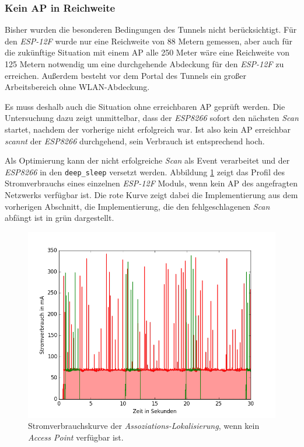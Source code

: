 \subsubsection{Kein AP in Reichweite}
Bisher wurden die besonderen Bedingungen des Tunnels nicht berücksichtigt.
Für den \emph{ESP-12F} wurde nur eine Reichweite von 88 Metern gemessen, aber auch für die zukünftige Situation mit einem AP alle 250 Meter wäre eine Reichweite von 125 Metern notwendig um eine durchgehende Abdeckung für den \emph{ESP-12F} zu erreichen.
Außerdem besteht vor dem Portal des Tunnels ein großer Arbeitsbereich ohne WLAN-Abdeckung.

Es muss deshalb auch die Situation ohne erreichbaren AP geprüft werden.
Die Untersuchung dazu zeigt unmittelbar, dass der \emph{ESP8266} sofort den nächsten \emph{Scan} startet, nachdem der vorherige nicht erfolgreich war.
Ist also kein AP erreichbar \emph{scannt} der \emph{ESP8266} durchgehend, sein Verbrauch ist entsprechend hoch.

Als Optimierung kann der nicht erfolgreiche \emph{Scan} als Event verarbeitet und der \emph{ESP8266} in den \texttt{deep\_sleep} versetzt werden.
Abbildung \ref{fig:noap} zeigt das Profil des Stromverbrauchs eines einzelnen \emph{ESP-12F} Moduls, wenn kein AP des angefragten Netzwerks verfügbar ist.
Die rote Kurve zeigt dabei die Implementierung aus dem vorherigen Abschnitt, die Implementierung, die den fehlgeschlagenen \emph{Scan} abfängt ist in grün dargestellt.

\begin{figure}[h!]
  \centering
	\includegraphics[width=\textwidth]{plots/noap.png}
  \caption{Stromverbrauchskurve der \emph{Assoziations-Lokalisierung}, wenn kein \emph{Access Point} verfügbar ist.}
  \label{fig:noap}
\end{figure}

